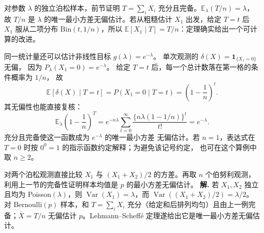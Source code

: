 对参数 \(\lambda\) 的独立泊松样本，前节证明 \(T=\sum_iX_i\) 充分且完备。\(\mathbb E_\lambda(T/n)=\lambda\)，故 \(T/n\) 是 \(\lambda\) 的唯一最小方差无偏估计。若从粗糙估计 \(X_1\) 出发，给定 \(T=t\) 后 \(X_1\) 服从二项分布 \(\mathrm{Bin}(t,1/n)\)，所以
\(\mathbb E[X_1\mid T]=T/n\)：定理确实给出一个可计算的改进。

同一统计量还可以估计非线性目标 \(g(\lambda)=e^{-\lambda}\)。
单次观测的 \(\delta(X)=\mathbf1_{\{X_1=0\}}\) 无偏，
因为 \(P_\lambda(X_1=0)=e^{-\lambda}\)。
给定 \(T=t\) 后，每一个总计数落在第一格的条件概率为 \(1/n\)，
故
\[
\mathbb E[\delta(X)\mid T=t]
=P(X_1=0\mid T=t)=\left(1-\frac1n\right)^t.
\]
其无偏性也能直接复核：
\[
\mathbb E_\lambda\left(1-\frac1n\right)^T
=e^{-n\lambda}\sum_{t=0}^\infty
\frac{\{n\lambda(1-1/n)\}^t}{t!}
=e^{-\lambda}.
\]
充分且完备使这一函数成为 \(e^{-\lambda}\) 的唯一最小方差
无偏估计。若 \(n=1\)，表达式在 \(T=0\) 时按
\(0^0=1\) 的指示函数约定解释；为避免该记号约定，
也可在这个算例中取 \(n\ge2\)。



\par
\begin{workedexample}
对两个泊松观测直接比较 \(X_1\) 与 \((X_1+X_2)/2\) 的方差。再取 \(n\) 个伯努利观测，利用上一节的完备性证明样本均值是 \(p\) 的最小方差无偏估计。
\textbf{解.} 若 \(X_1,X_2\) 独立且均为 Poisson\((\lambda)\)，则 \(\operatorname{Var}(X_1)=\lambda\)，而 \(\operatorname{Var}((X_1+X_2)/2)=\lambda/2\)。对 Bernoulli\((p)\) 样本，和 \(T=\sum_iX_i\) 充分（给定和后排列均匀）且由上一例完备；\(\bar X=T/n\) 无偏估计 \(p\)。Lehmann--Scheffé 定理遂给出它是唯一最小方差无偏估计。
\end{workedexample}
\par
